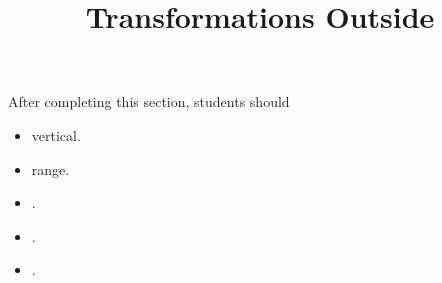 \documentclass{ximera}
\title{Transformations Outside}
\begin{document}
\begin{abstract}
\end{abstract}
\maketitle

\begin{sectionOutcomes}
After completing this section, students should 

\begin{itemize}
\item vertical.
\item range.
\item .
\item .
\item .
\end{itemize}
\end{sectionOutcomes}
\end{document}
